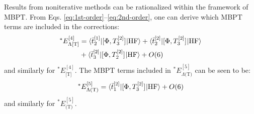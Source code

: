 Results from noniterative methods can be rationalized within the
framework of \acrshort{MBPT}.\autocite{Stanton1997-lx, Koch1997-nm,
Eriksen2014-gy, Eriksen2015-il, Kristensen2016-od}
From Eqs. \eqref{eq:1st-order}--\eqref{eq:2nd-order}, one can derive
which \acrshort{MBPT} terms are included in the corrections:
\begin{equation}
  \begin{aligned}
  {}^* E^{[4]}_{\Lambda\text{[T]}}
  &=
    \braket{\bar{t}_{2}^{[1]}| [ \Phi, T_3^{[2]} ]^{} | \mathrm{HF}}
  + \braket{\bar{t}_{2}^{[2]} | [ \Phi, T_3^{[2]} ]^{} | \mathrm{HF}} \\
  &+ \braket{\bar{t}_{3}^{[2]} | [ \Phi, T_2^{[2]} ]^{} | \mathrm{HF}}
  + O(6)
  \end{aligned}
\end{equation}
and similarly for ${}^* E^{[4]}_{\text{[T]}}$.
The \acrshort{MBPT} terms included in ${}^*
E^{[5]}_{\Lambda\text{(T)}}$ can be seen to be:
\begin{equation}
  {}^* E^{[5]}_{\Lambda\text{(T)}}
  =
  \braket{\bar{t}_{1}^{[2]} | [ \Phi, T_3^{[2]} ]^{} | \mathrm{HF}}
  + O(6)
\end{equation}
and similarly for ${}^* E^{[5]}_{\text{(T)}}$.
